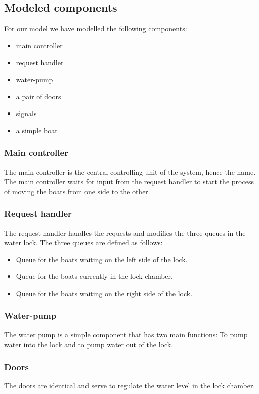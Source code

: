 \documentclass{article}
\begin{document}
    \subsection{Modeled components} \label{subsec:modelcomp}
        For our model we have modelled the following components:
        \begin{itemize}
            \item main controller
            \item request handler
            \item water-pump
            \item a pair of doors
            \item signals
            \item a simple boat
        \end{itemize}
        
        \subsubsection{Main controller}
            The main controller is the central controlling unit of the system, hence the name. The main controller waits for input from the request handler to start the process of moving the boats from one side to the other.
        \subsubsection{Request handler}
            The request handler handles the requests and modifies the three queues in the water lock. The three queues are defined as follows:
            \begin{itemize}
                \item Queue for the boats waiting on the left side of the lock.
                \item Queue for the boats currently in the lock chamber.
                \item Queue for the boats waiting on the right side of the lock.
            \end{itemize}
        \subsubsection{Water-pump}
            The water pump is a simple component that has two main functions: To pump water into the lock and to pump water out of the lock. 
        \subsubsection{Doors}
            The doors are identical and serve to regulate the water level in the lock chamber. 
\end{document}
